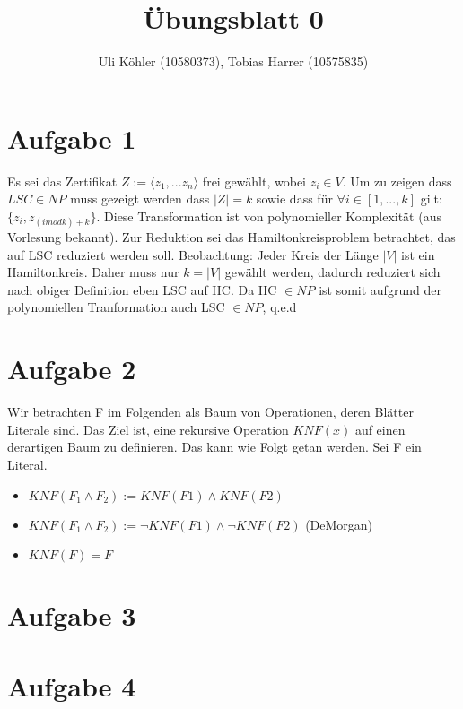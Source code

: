 \documentclass[a4paper,10pt,oneside,leqno]{scrartcl}
\title{Übungsblatt 0}
\author{Uli Köhler (10580373), Tobias Harrer (10575835)}
\begin{document}
\maketitle
\section*{Aufgabe 1}%
Es sei das Zertifikat $Z := \langle z_1,...z_n\rangle$ frei gewählt, wobei $z_i \in V$.
Um zu zeigen dass $LSC \in NP$ muss gezeigt werden dass $|Z| = k$ sowie dass für $\forall i \in [1,...,k]$ gilt:
$\{z_i,z_{(i mod k) + k}\}$. Diese Transformation ist von polynomieller Komplexität (aus Vorlesung bekannt).
Zur Reduktion sei das Hamiltonkreisproblem betrachtet, das auf LSC reduziert werden soll.
Beobachtung: Jeder Kreis der Länge $|V|$ ist ein Hamiltonkreis. Daher muss nur $k = |V|$ gewählt werden, dadurch reduziert sich nach obiger Definition eben LSC auf HC. Da HC $\in NP$ ist somit aufgrund der polynomiellen Tranformation auch LSC $\in NP$, q.e.d

\section*{Aufgabe 2}%
Wir betrachten F im Folgenden als Baum von Operationen, deren Blätter Literale sind.
Das Ziel ist, eine rekursive Operation $KNF(x)$ auf einen derartigen Baum zu definieren. Das kann wie Folgt getan werden. Sei F ein Literal.
\begin{itemize}
 \item $KNF(F_1 \wedge F_2) := KNF(F1) \wedge KNF(F2)$
 \item $KNF(F_1 \wedge F_2) := \neg KNF(F1) \wedge \neg KNF(F2)$ (DeMorgan)
 \item $KNF(F) = F$
\end{itemize}

\section*{Aufgabe 3}%

\section*{Aufgabe 4}%
\end{document}
